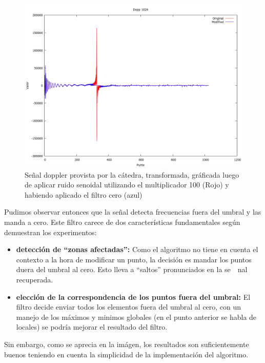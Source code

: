 \begin{figure}
\begin {center}
\includegraphics[width=360pt]{imagenes/dopp1024-sin100-zero-spec.png}
\end {center}
\caption{Se\~nal doppler provista por la c\'atedra, transformada, gr\'aficada
luego de aplicar ruido senoidal utilizando el multiplicador 100 (Rojo) y 
habiendo aplicado el filtro cero (azul)}
\label{fig:SinProm}
\end{figure}

Pudimos observar entonces que la se\~nal detecta frecuencias fuera del umbral y
las manda a cero. Este filtro carece de dos caracter\'isticas fundamentales
seg\'un demuestran los experimentos:

\begin{itemize}
	\item {\bf detecci\'on de ``zonas afectadas'':} Como el algoritmo no tiene en
cuenta el contexto a la hora de modificar un punto, la decisi\'on es mandar los
puntos duera del umbral al cero. Esto lleva a ``saltos'' pronunciados en la se\
~nal recuperada.

	\item {\bf elecci\'on de la correspondencia de los puntos fuera del umbral:}
El filtro decide enviar todos los elementos fuera del umbral al cero, con un
manejo de los m\'aximos y minimos globales (en el punto anterior se habla de
locales) se podr\'ia mejorar el resultado del filtro.
\end{itemize}

Sin embargo, como se aprecia en la im\'agen, los resultados son suficientemente
buenos teniendo en cuenta la simplicidad de la implementaci\'on del algoritmo.

